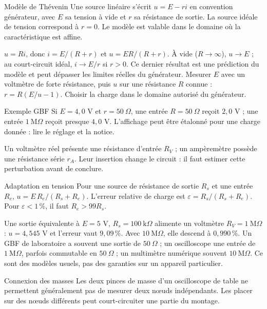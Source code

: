 \begin{loi}{Modèle de Thévenin}
Une source linéaire s’écrit $u=E-ri$ en convention générateur, avec $E$ sa tension à vide et $r$ sa résistance de sortie. La source idéale de tension correspond à $r=0$. Le modèle est valable dans le domaine où la caractéristique est affine.
\end{loi}
$u=Ri$, donc $i=E/(R+r)$ et $u=ER/(R+r)$. À vide ($R\to\infty$), $u\to E$ ; au court-circuit idéal, $i\to E/r$ si $r>0$. Ce dernier résultat est une prédiction du modèle et peut dépasser les limites réelles du générateur.
Mesurer $E$ avec un voltmètre de forte résistance, puis $u$ sur une résistance $R$ connue : $r=R(E/u-1)$. Choisir la charge dans le domaine autorisé du générateur.
\begin{methode}{Exemple GBF}
Si $E=4{,}0$ V et $r=50\ \Omega$, une entrée $R=50\ \Omega$ reçoit $2{,}0$ V ; une entrée $1\ \mathrm{M}\Omega$ reçoit presque $4{,}0$ V. L’affichage peut être étalonné pour une charge donnée : lire le réglage et la notice.
\end{methode}


Un voltmètre réel présente une résistance d’entrée $R_V$ ; un ampèremètre possède une résistance série $r_A$. Leur insertion change le circuit : il faut estimer cette perturbation avant de conclure.
\begin{loi}{Adaptation en tension}
Pour une source de résistance de sortie $R_s$ et une entrée $R_e$, $u=E\,R_e/(R_s+R_e)$. L’erreur relative de charge est $\varepsilon=R_s/(R_s+R_e)$. Pour $\varepsilon<1\,\%$, il faut $R_e>99R_s$.
\end{loi}
Une sortie équivalente à $E=5$ V, $R_s=100\ \mathrm{k}\Omega$ alimente un voltmètre $R_V=1\ \mathrm{M}\Omega$ : $u=4{,}545$ V et l’erreur vaut $9{,}09\,\%$. Avec $10\ \mathrm{M}\Omega$, elle descend à $0{,}990\,\%$.
Un GBF de laboratoire a souvent une sortie de $50\ \Omega$ ; un oscilloscope une entrée de $1\ \mathrm{M}\Omega$, parfois commutable en $50\ \Omega$ ; un multimètre numérique souvent $10\ \mathrm{M}\Omega$. Ce sont des modèles usuels, pas des garanties sur un appareil particulier.
\begin{piege}{Connexion des masses}
Les deux pinces de masse d’un oscilloscope de table ne permettent généralement pas de mesurer deux nœuds indépendants. Les placer sur des nœuds différents peut court-circuiter une partie du montage.
\end{piege}


